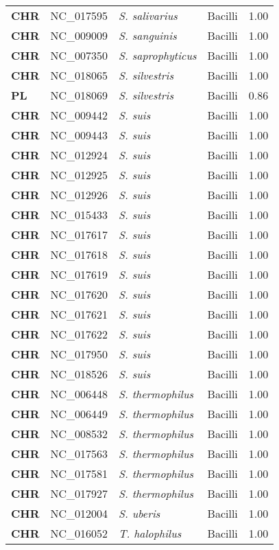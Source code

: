 \begin{adjustwidth}{-3cm}{2cm}
{\begin{supertabular}{>{\bfseries}l|p{0.1\textwidth}p{0.14\textwidth}l|l}
CHR & NC\_017595 & \textit{S. salivarius} & Bacilli & 1.00\\
CHR & NC\_009009 & \textit{S. sanguinis} & Bacilli & 1.00\\
CHR & NC\_007350 & \textit{S. saprophyticus} & Bacilli & 1.00\\
CHR & NC\_018065 & \textit{S. silvestris} & Bacilli & 1.00\\
PL & NC\_018069 & \textit{S. silvestris} & Bacilli & 0.86\\
CHR & NC\_009442 & \textit{S. suis} & Bacilli & 1.00\\
CHR & NC\_009443 & \textit{S. suis} & Bacilli & 1.00\\
CHR & NC\_012924 & \textit{S. suis} & Bacilli & 1.00\\
CHR & NC\_012925 & \textit{S. suis} & Bacilli & 1.00\\
CHR & NC\_012926 & \textit{S. suis} & Bacilli & 1.00\\
CHR & NC\_015433 & \textit{S. suis} & Bacilli & 1.00\\
CHR & NC\_017617 & \textit{S. suis} & Bacilli & 1.00\\
CHR & NC\_017618 & \textit{S. suis} & Bacilli & 1.00\\
CHR & NC\_017619 & \textit{S. suis} & Bacilli & 1.00\\
CHR & NC\_017620 & \textit{S. suis} & Bacilli & 1.00\\
CHR & NC\_017621 & \textit{S. suis} & Bacilli & 1.00\\
CHR & NC\_017622 & \textit{S. suis} & Bacilli & 1.00\\
CHR & NC\_017950 & \textit{S. suis} & Bacilli & 1.00\\
CHR & NC\_018526 & \textit{S. suis} & Bacilli & 1.00\\
CHR & NC\_006448 & \textit{S. thermophilus} & Bacilli & 1.00\\
CHR & NC\_006449 & \textit{S. thermophilus} & Bacilli & 1.00\\
CHR & NC\_008532 & \textit{S. thermophilus} & Bacilli & 1.00\\
CHR & NC\_017563 & \textit{S. thermophilus} & Bacilli & 1.00\\
CHR & NC\_017581 & \textit{S. thermophilus} & Bacilli & 1.00\\
CHR & NC\_017927 & \textit{S. thermophilus} & Bacilli & 1.00\\
CHR & NC\_012004 & \textit{S. uberis} & Bacilli & 1.00\\
CHR & NC\_016052 & \textit{T. halophilus} & Bacilli & 1.00\\

\end{supertabular}}
\end{adjustwidth}
